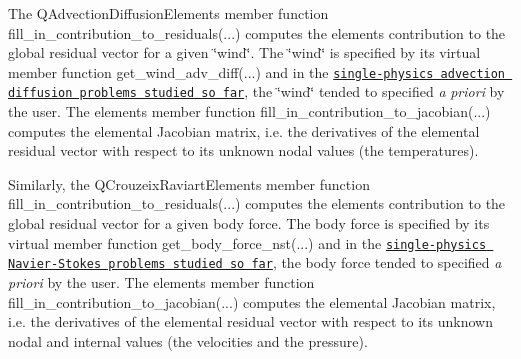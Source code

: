 \begin{DoxyItemize}
\item The {\ttfamily Q\+Advection\+Diffusion\+Element\textquotesingle{}s} member function {\ttfamily fill\+\_\+in\+\_\+contribution\+\_\+to\+\_\+residuals}(...) computes the element\textquotesingle{}s contribution to the global residual vector for a given \char`\"{}wind\char`\"{}. The \char`\"{}wind\char`\"{} is specified by its virtual member function {\ttfamily get\+\_\+wind\+\_\+adv\+\_\+diff}(...) and in the \href{../../../advection_diffusion/two_d_adv_diff_adapt/html/index.html}{\tt single-\/physics advection diffusion problems studied so far}, the \char`\"{}wind\char`\"{} tended to specified {\itshape a} {\itshape priori} by the user. The element\textquotesingle{}s member function {\ttfamily fill\+\_\+in\+\_\+contribution\+\_\+to\+\_\+jacobian}(...) computes the elemental Jacobian matrix, i.\+e. the derivatives of the elemental residual vector with respect to its unknown nodal values (the temperatures). ~\newline
~\newline

\item Similarly, the {\ttfamily Q\+Crouzeix\+Raviart\+Element\textquotesingle{}s} member function {\ttfamily fill\+\_\+in\+\_\+contribution\+\_\+to\+\_\+residuals}(...) computes the element\textquotesingle{}s contribution to the global residual vector for a given body force. The body force is specified by its virtual member function {\ttfamily get\+\_\+body\+\_\+force\+\_\+nst}(...) and in the \href{../../../navier_stokes/circular_driven_cavity/html/index.html}{\tt single-\/physics Navier-\/\+Stokes problems studied so far}, the body force tended to specified {\itshape a} {\itshape priori} by the user. The element\textquotesingle{}s member function {\ttfamily fill\+\_\+in\+\_\+contribution\+\_\+to\+\_\+jacobian}(...) computes the elemental Jacobian matrix, i.\+e. the derivatives of the elemental residual vector with respect to its unknown nodal and internal values (the velocities and the pressure).
\end{DoxyItemize}

